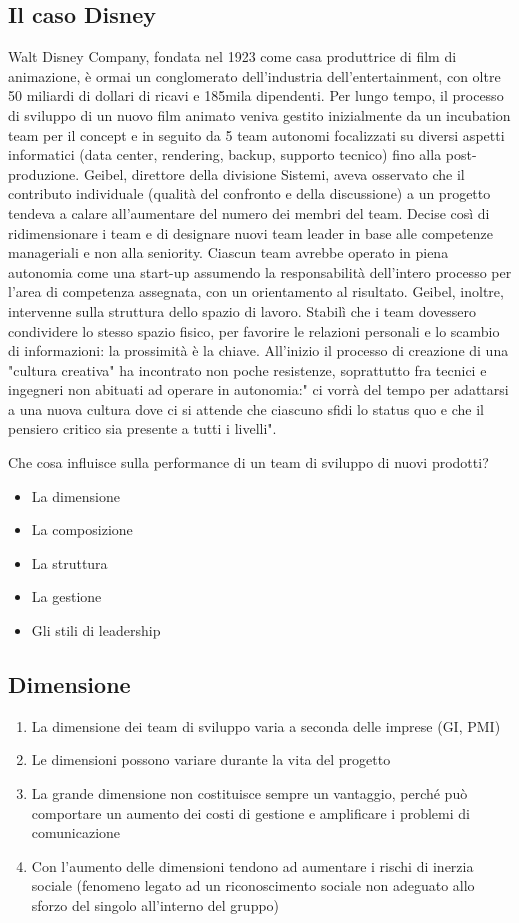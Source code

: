 \documentclass{article}
\begin{document}
\subsection{Il caso Disney}
Walt Disney Company, fondata nel 1923 come casa produttrice di film di animazione, è
ormai un conglomerato dell’industria dell’entertainment, con oltre 50 miliardi di dollari di
ricavi e 185mila dipendenti.
Per lungo tempo, il processo di sviluppo di un nuovo film animato veniva gestito inizialmente
da un incubation team per il concept e in seguito da 5 team autonomi focalizzati su diversi
aspetti informatici (data center, rendering, backup, supporto tecnico) fino alla post-
produzione.
Geibel, direttore della divisione Sistemi, aveva osservato che il contributo individuale
(qualità del confronto e della discussione) a un progetto tendeva a calare all’aumentare del
numero dei membri del team.
Decise così di ridimensionare i team e di designare nuovi team leader in base alle
competenze manageriali e non alla seniority. Ciascun team avrebbe operato in piena
autonomia come una start-up assumendo la responsabilità dell’intero processo per l’area di
competenza assegnata, con un orientamento al risultato.
Geibel, inoltre, intervenne sulla struttura dello spazio di lavoro. Stabilì che i team dovessero
condividere lo stesso spazio fisico, per favorire le relazioni personali e lo scambio di
informazioni: la prossimità è la chiave.
All’inizio il processo di creazione di una "cultura creativa" ha incontrato non poche
resistenze, soprattutto fra tecnici e ingegneri non abituati ad operare in autonomia:" ci vorrà
del tempo per adattarsi a una nuova cultura dove ci si attende che ciascuno sfidi lo status
quo e che il pensiero critico sia presente a tutti i livelli".

Che cosa influisce sulla performance di un team di sviluppo di
nuovi prodotti?
\begin{itemize}
\item La dimensione
\item La composizione
\item La struttura
\item La gestione
\item Gli stili di leadership
\end{itemize}

\subsection{Dimensione}
\begin{enumerate}
\item La dimensione dei team di sviluppo varia a seconda delle imprese
(GI, PMI)
\item  Le dimensioni possono variare durante la vita del progetto
\item  La grande dimensione non costituisce sempre un vantaggio,
perché può comportare un aumento dei costi di gestione e
amplificare i problemi di comunicazione
\item Con l’aumento delle dimensioni tendono ad aumentare i rischi di
inerzia sociale (fenomeno legato ad un riconoscimento sociale
non adeguato allo sforzo del singolo all’interno del gruppo)
\end{enumerate}
\end{document}
